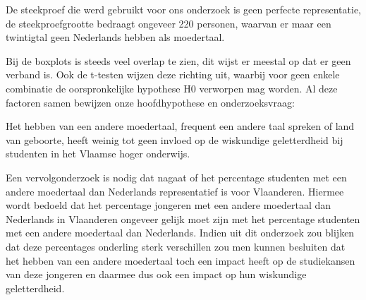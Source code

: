 \documentclass{hogent-article}
\begin{document}
De steekproef die werd gebruikt voor ons onderzoek is geen perfecte representatie, de steekproefgrootte bedraagt ongeveer 220 personen, waarvan er maar een twintigtal geen Nederlands hebben als moedertaal.

Bij de boxplots is steeds veel overlap te zien, dit wijst er meestal op dat er geen verband is. Ook de t-testen wijzen deze richting uit, waarbij voor geen enkele combinatie de oorspronkelijke hypothese H0 verworpen mag worden. Al deze factoren samen bewijzen onze hoofdhypothese en onderzoeksvraag:

Het hebben van een andere moedertaal, frequent een andere taal spreken of land van geboorte, heeft weinig tot geen invloed op de wiskundige geletterdheid bij studenten in het Vlaamse hoger onderwijs.

Een vervolgonderzoek is nodig dat nagaat of het percentage studenten met een andere moedertaal dan Nederlands representatief is voor Vlaanderen. Hiermee wordt bedoeld dat het percentage jongeren met een andere moedertaal dan Nederlands in Vlaanderen ongeveer gelijk moet zijn met het percentage studenten met een andere moedertaal dan Nederlands. Indien uit dit onderzoek zou blijken dat deze percentages onderling sterk verschillen zou men kunnen besluiten dat het hebben van een andere moedertaal toch een impact heeft op de studiekansen van deze jongeren en daarmee dus ook een impact op hun wiskundige geletterdheid.


\printbibliography[heading=bibintoc]
\end{document}
